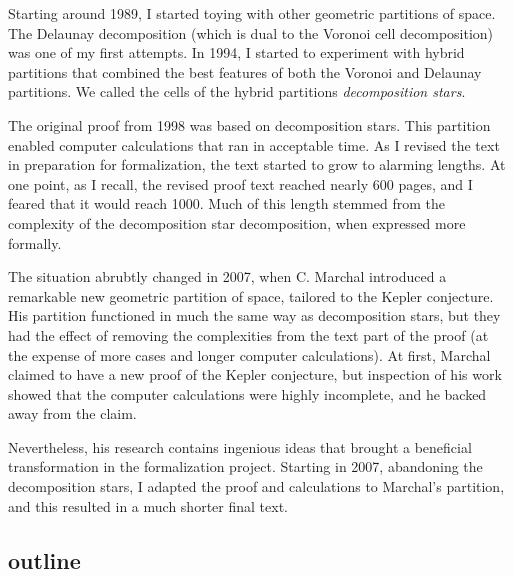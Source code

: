 \documentclass{amsart}
\begin{document}
Starting around 1989, I started toying with other geometric partitions
of space.  The Delaunay decomposition (which is dual to the Voronoi
cell decomposition) was one of my first attempts.  In 1994, I started
to experiment with hybrid partitions that combined the best features
of both the Voronoi and Delaunay partitions.  We called the cells of
the hybrid partitions \emph{decomposition stars}.  

The original proof from 1998 was based on decomposition stars.  This
partition enabled computer calculations that ran in acceptable time.
As I revised the text in preparation for formalization, the text
started to grow to alarming lengths.  At one point, as I recall, the
revised proof text reached nearly 600 pages, and I feared that it would
reach 1000.  Much of this length stemmed from the complexity of the
decomposition star decomposition, when expressed more formally.

The situation abrubtly changed in 2007, when C. Marchal introduced a
remarkable new geometric partition of space, tailored to the Kepler
conjecture.  His partition functioned in much the same way as
decomposition stars, but they had the effect of removing the
complexities from the text part of the proof (at the expense of more
cases and longer computer calculations).  At first, Marchal claimed to
have a new proof of the Kepler conjecture, but inspection of his work
showed that the computer calculations were highly incomplete, and he
backed away from the claim.  

Nevertheless, his research contains ingenious ideas that brought a
beneficial transformation in the formalization project.  Starting in
2007, abandoning the decomposition stars, I adapted the proof and
calculations to Marchal's partition, and this resulted in a much
shorter final text.

\subsection{outline}
\end{document}
